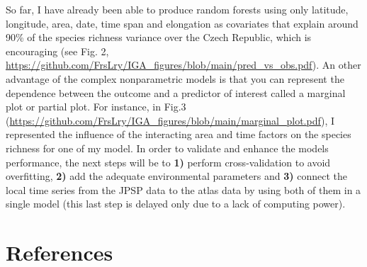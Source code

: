 \documentclass[
  12pt,
  oneside]{report}
\begin{document}
So far, I have already been able to produce random forests using only latitude, longitude, area, date, time span and elongation as covariates that explain around 90\% of the species richness variance over
the Czech Republic, which is encouraging (see Fig. 2,
\url{https://github.com/FrsLry/IGA_figures/blob/main/pred_vs_obs.pdf}). An other advantage of the complex
nonparametric models is that you can represent the dependence between the outcome and a
predictor of interest called a marginal plot or partial plot. For instance, in Fig.3
(\url{https://github.com/FrsLry/IGA_figures/blob/main/marginal_plot.pdf}), I represented the influence of the
interacting area and time factors on the species richness for one of my model. In order to validate and
enhance the models performance, the next steps will be to \textbf{1)} perform cross-validation to avoid
overfitting, \textbf{2)} add the adequate environmental parameters and \textbf{3)} connect the local time series from
the JPSP data to the atlas data by using both of them in a single model (this last step is delayed only
due to a lack of computing power).


\singlespacing %
\chapter{References}\label{references}
{
\renewcommand{\clearpage}{}
\printbibliography[heading=none] %
}
\end{document}
